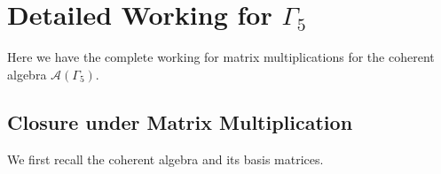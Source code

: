 


\clearpage
\renewcommand{\thepage}{C\arabic{page}}
\setcounter{page}{1}
\section{Detailed Working for \texorpdfstring{$\Gamma_5$}{Gamma 5}}
Here we have the complete working for matrix multiplications for the coherent algebra $\mathcal{A}(\Gamma_5)$.

\subsection*{Closure under Matrix Multiplication}\label{working:gamma-5}
We first recall the coherent algebra and its basis matrices.


